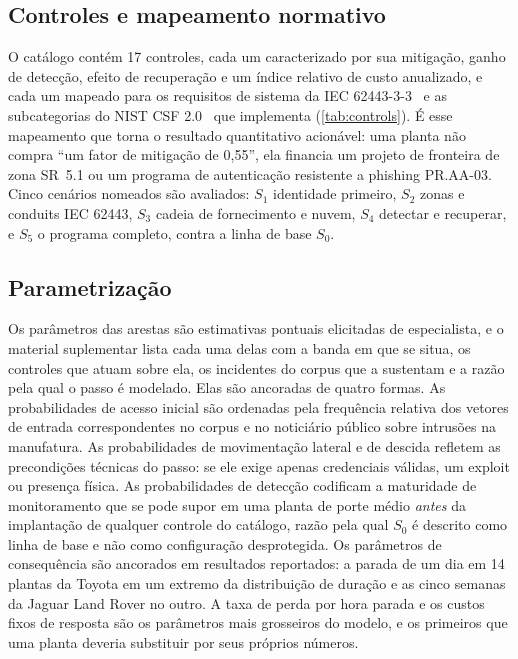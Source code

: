 \subsection{Controles e mapeamento normativo}

O catálogo contém 17 controles, cada um caracterizado por sua mitigação, ganho
de detecção, efeito de recuperação e um índice relativo de custo anualizado, e
cada um mapeado para os requisitos de sistema da IEC
62443-3-3~\cite{iec624433303} e as subcategorias do NIST CSF
2.0~\cite{nistcsf2} que implementa (\cref{tab:controls}). É esse mapeamento que
torna o resultado quantitativo acionável: uma planta não compra ``um fator de
mitigação de 0,55'', ela financia um projeto de fronteira de zona SR~5.1 ou um
programa de autenticação resistente a phishing PR.AA-03. Cinco cenários nomeados
são avaliados: $S_1$ identidade primeiro, $S_2$ zonas e conduits IEC 62443,
$S_3$ cadeia de fornecimento e nuvem, $S_4$ detectar e recuperar, e $S_5$ o
programa completo, contra a linha de base $S_0$.



\subsection{Parametrização}

Os parâmetros das arestas são estimativas pontuais elicitadas de especialista,
e o material suplementar lista cada uma delas com a banda em que se situa, os
controles que atuam sobre ela, os incidentes do corpus que a sustentam e a
razão pela qual o passo é modelado. Elas são ancoradas de quatro formas. As probabilidades de acesso inicial são ordenadas
pela frequência relativa dos vetores de entrada correspondentes no corpus e no
noticiário público sobre intrusões na manufatura. As probabilidades de
movimentação lateral e de descida refletem as precondições técnicas do passo: se ele exige apenas credenciais
válidas, um exploit ou presença física. As
probabilidades de detecção codificam a maturidade de monitoramento que se pode
supor em uma planta de porte médio \emph{antes} da implantação de qualquer
controle do catálogo, razão pela qual $S_0$ é descrito como linha de base e não
como configuração desprotegida. Os parâmetros de consequência são ancorados em resultados reportados: a parada
de um dia em 14 plantas da Toyota em um extremo da distribuição de duração e
as cinco semanas da Jaguar Land Rover no outro. A taxa de perda por hora
parada e os custos fixos de resposta são os parâmetros mais grosseiros do
modelo, e os primeiros que uma planta deveria substituir por seus próprios
números.

